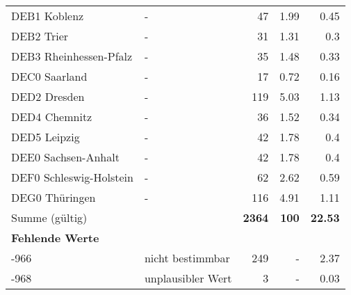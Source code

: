 \begin{longtable}{Xlrrr}
        \multicolumn{1}{X}{DEB1 Koblenz} & - & \num{47} & \num[round-mode=places,round-precision=2]{1.99} & \num[round-mode=places,round-precision=2]{0.45} \\
        \multicolumn{1}{X}{DEB2 Trier} & - & \num{31} & \num[round-mode=places,round-precision=2]{1.31} & \num[round-mode=places,round-precision=2]{0.3} \\
        \multicolumn{1}{X}{DEB3 Rheinhessen-Pfalz} & - & \num{35} & \num[round-mode=places,round-precision=2]{1.48} & \num[round-mode=places,round-precision=2]{0.33} \\
        \multicolumn{1}{X}{DEC0 Saarland} & - & \num{17} & \num[round-mode=places,round-precision=2]{0.72} & \num[round-mode=places,round-precision=2]{0.16} \\
        \multicolumn{1}{X}{DED2 Dresden} & - & \num{119} & \num[round-mode=places,round-precision=2]{5.03} & \num[round-mode=places,round-precision=2]{1.13} \\
        \multicolumn{1}{X}{DED4 Chemnitz} & - & \num{36} & \num[round-mode=places,round-precision=2]{1.52} & \num[round-mode=places,round-precision=2]{0.34} \\
        \multicolumn{1}{X}{DED5 Leipzig} & - & \num{42} & \num[round-mode=places,round-precision=2]{1.78} & \num[round-mode=places,round-precision=2]{0.4} \\
        \multicolumn{1}{X}{DEE0 Sachsen-Anhalt} & - & \num{42} & \num[round-mode=places,round-precision=2]{1.78} & \num[round-mode=places,round-precision=2]{0.4} \\
        \multicolumn{1}{X}{DEF0 Schleswig-Holstein} & - & \num{62} & \num[round-mode=places,round-precision=2]{2.62} & \num[round-mode=places,round-precision=2]{0.59} \\
        \multicolumn{1}{X}{DEG0 Thüringen} & - & \num{116} & \num[round-mode=places,round-precision=2]{4.91} & \num[round-mode=places,round-precision=2]{1.11} \\
     \midrule
      \multicolumn{2}{l}{Summe (gültig)} & \textbf{\num{2364}} &
      \textbf{\num{100}} &
         \textbf{\num[round-mode=places,round-precision=2]{22.53}} \\
     \multicolumn{5}{l}{\textbf{Fehlende Werte}}\\
       -966 & nicht bestimmbar & \num{249} & - & \num[round-mode=places,round-precision=2]{2.37} \\

       -968 & unplausibler Wert & \num{3} & - & \num[round-mode=places,round-precision=2]{0.03} \\


\end{longtable}
